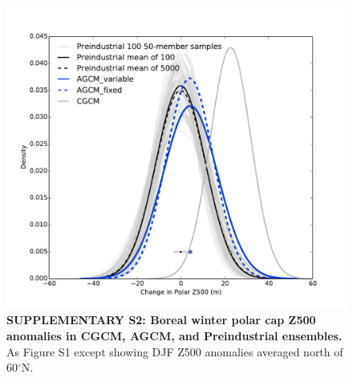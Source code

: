 \documentclass{nature}
\begin{document}
\begin{figure}%
\centering
\noindent\includegraphics[width=29pc]{Word/SuppFigure_2_polarcapz500.pdf}
\caption{\textbf{SUPPLEMENTARY S2: Boreal winter polar cap Z500 anomalies in CGCM, AGCM, and Preindustrial ensembles.} As Figure S1 except showing DJF Z500 anomalies averaged north of 60$^\circ$N.
}
\label{fig:supp1} 
\end{figure}
\end{document}
